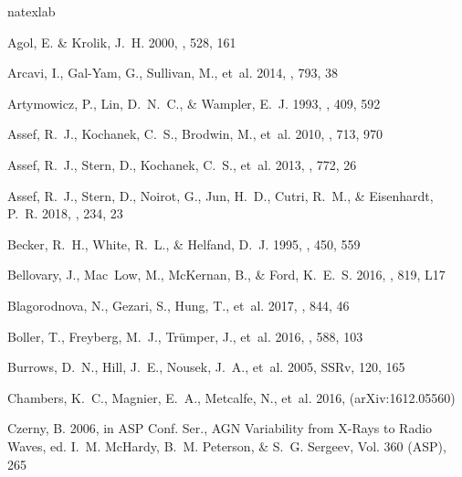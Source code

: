 \documentclass[iop]{emulateapj}
\begin{document}
\begin{thebibliography}{84}
\expandafter\ifx\csname natexlab\endcsname\relax\def\natexlab#1{#1}\fi

Agol, E. \& Krolik, J.~H. 2000, \apj, 528, 161

Arcavi, I., Gal-Yam, G., Sullivan, M., {et~al.} 2014, \apj, 793, 38

Artymowicz, P., Lin, D.~N.~C., \& Wampler, E.~J. 1993, \apj, 409, 592

Assef, R.~J., Kochanek, C.~S., Brodwin, M., {et~al.} 2010, \apj, 713, 970

Assef, R.~J., Stern, D., Kochanek, C.~S., {et~al.} 2013, \apj, 772, 26

Assef, R.~J., Stern, D., Noirot, G., Jun, H.~D., Cutri, R.~M., \& Eisenhardt,
  P.~R. 2018, \apjs, 234, 23

Becker, R.~H., White, R.~L., \& Helfand, D.~J. 1995, \apj, 450, 559

Bellovary, J., {Mac~Low}, M., McKernan, B., \& Ford, K.~E.~S. 2016, \apj, 819,
  L17

Blagorodnova, N., Gezari, S., Hung, T., {et~al.} 2017, \apj, 844, 46

Boller, T., Freyberg, M.~J., Tr\"umper, J., {et~al.} 2016, \aap, 588, 103

Burrows, D.~N., Hill, J.~E., Nousek, J.~A., {et~al.} 2005, SSRv, 120, 165

Chambers, K.~C., Magnier, E.~A., Metcalfe, N., {et~al.} 2016,
  (arXiv:1612.05560)

Czerny, B. 2006, in ASP Conf. Ser., AGN Variability from X-Rays to Radio Waves,
  ed. I.~M. McHardy, B.~M. Peterson, \& S.~G. Sergeev, Vol. 360 (ASP), 265


\end{thebibliography}
\end{document}
